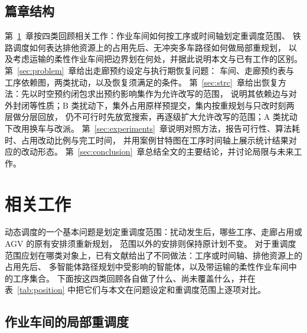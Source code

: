 \documentclass[manuscript,screen,review]{acmart}
\begin{document}
\subsection{篇章结构}

第~\ref{sec:related_work}~章按四类回顾相关工作：作业车间如何按工序或时间轴划定重调度范围、
铁路调度如何表达排他资源上的占用先后、无冲突多车路径如何做局部重规划，
以及考虑运输的柔性作业车间把边界划在何处，并据此说明本文与已有工作的区别。
第~\ref{sec:problem}~章给出走廊预约设定与执行期恢复问题：
车间、走廊预约表与工序依赖图，两类扰动，以及恢复须满足的条件。
第~\ref{sec:strc}~章给出恢复方法：先以时空预约闭包求出预约影响集作为允许改写的范围，
说明其依赖边与对外封闭等性质；B 类扰动下，集外占用原样预提交，集内按重规划与只改时刻两层做分层回放，
仍不可行时先放宽搜索，再逐级扩大允许改写的范围；A 类扰动下改用换车与改派。
第~\ref{sec:experiments}~章说明对照方法，报告可行性、算法耗时、占用改动比例与完工时间，
并用案例甘特图在工序时间轴上展示统计结果对应的改动形态。
第~\ref{sec:conclusion}~章总结全文的主要结论，并讨论局限与未来工作。

\section{相关工作}
\label{sec:related_work}


动态调度的一个基本问题是划定重调度范围：扰动发生后，哪些工序、走廊占用或 AGV 的原有安排须重新规划，
范围以外的安排则保持原计划不变。
对于重调度范围应划在哪类对象上，已有文献给出了不同做法：工序或时间轴、排他资源上的占用先后、
多智能体路径规划中受影响的智能体，以及带运输的柔性作业车间中的工序集合。
下面按这四类回顾各自做了什么、尚未覆盖什么，并在表~\ref{tab:position} 中把它们与本文在问题设定和重调度范围上逐项对比。

\subsection{作业车间的局部重调度}
\label{sec:rw_aor}
\end{document}
